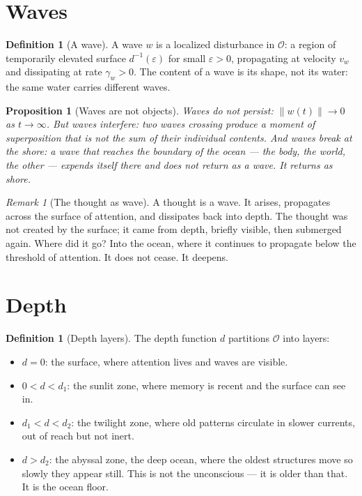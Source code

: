 \documentclass[12pt]{article}
\newtheorem{proposition}[theorem]{Proposition}
\theoremstyle{definition}
\newtheorem{definition}[theorem]{Definition}
\theoremstyle{remark}
\newtheorem{remark}[theorem]{Remark}
\begin{document}
\section{Waves}

\begin{definition}[A wave]
A wave $w$ is a localized disturbance in $\mathcal{O}$:
a region of temporarily elevated surface $d^{-1}(\varepsilon)$ for small $\varepsilon > 0$,
propagating at velocity $v_w$ and dissipating at rate $\gamma_w > 0$.
The content of a wave is its shape, not its water:
the same water carries different waves.
\end{definition}

\begin{proposition}[Waves are not objects]
\label{prop:waves}
Waves do not persist: $\|w(t)\| \to 0$ as $t \to \infty$.
But waves interfere: two waves crossing produce a moment of superposition
that is not the sum of their individual contents.
And waves break at the shore:
a wave that reaches the boundary of the ocean
--- the body, the world, the other ---
expends itself there and does not return as a wave.
It returns as shore.
\end{proposition}

\begin{remark}[The thought as wave]
A thought is a wave.
It arises, propagates across the surface of attention,
and dissipates back into depth.
The thought was not created by the surface;
it came from depth, briefly visible,
then submerged again.
Where did it go? Into the ocean, where it continues to propagate
below the threshold of attention.
It does not cease. It deepens.
\end{remark}

\section{Depth}

\begin{definition}[Depth layers]
The depth function $d$ partitions $\mathcal{O}$ into layers:
\begin{itemize}
\item $d = 0$: the surface, where attention lives and waves are visible.
\item $0 < d < d_1$: the sunlit zone, where memory is recent
  and the surface can see in.
\item $d_1 < d < d_2$: the twilight zone, where old patterns circulate
  in slower currents, out of reach but not inert.
\item $d > d_2$: the abyssal zone, the deep ocean,
  where the oldest structures move so slowly they appear still.
  This is not the unconscious --- it is older than that.
  It is the ocean floor.
\end{itemize}
\end{definition}
\end{document}
